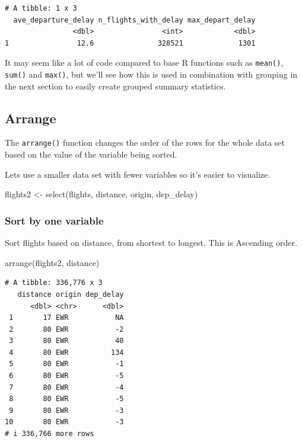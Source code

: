 \documentclass[
  letterpaper,
  DIV=11,
  numbers=noendperiod,
  oneside]{scrreprt}
\newenvironment{Shaded}{\begin{snugshade}}{\end{snugshade}}
\newcommand{\FunctionTok}[1]{\textcolor[rgb]{0.28,0.35,0.67}{#1}}
\newcommand{\NormalTok}[1]{\textcolor[rgb]{0.00,0.23,0.31}{#1}}
\newcommand{\OtherTok}[1]{\textcolor[rgb]{0.00,0.23,0.31}{#1}}
\begin{document}
\begin{verbatim}
# A tibble: 1 x 3
  ave_departure_delay n_flights_with_delay max_depart_delay
                <dbl>                <int>            <dbl>
1                12.6               328521             1301
\end{verbatim}

It may seem like a lot of code compared to base R functions such as
\texttt{mean()}, \texttt{sum()} and \texttt{max()}, but we'll see how
this is used in combination with grouping in the next section to easily
create grouped summary statistics.

\subsection{Arrange}\label{arrange}

The \texttt{arrange()} function changes the order of the rows for the
whole data set based on the value of the variable being sorted.

Lets use a smaller data set with fewer variables so it's easier to
visualize.

\begin{Shaded}
\begin{Highlighting}[]
\NormalTok{flights2 }\OtherTok{\textless{}{-}} \FunctionTok{select}\NormalTok{(flights, distance, origin, dep\_delay)}
\end{Highlighting}
\end{Shaded}

\subsubsection{Sort by one variable}\label{sort-by-one-variable}

Sort flights based on distance, from shortest to longest. This is
Ascending order.

\begin{Shaded}
\begin{Highlighting}[]
\FunctionTok{arrange}\NormalTok{(flights2, distance)}
\end{Highlighting}
\end{Shaded}

\begin{verbatim}
# A tibble: 336,776 x 3
   distance origin dep_delay
      <dbl> <chr>      <dbl>
 1       17 EWR           NA
 2       80 EWR           -2
 3       80 EWR           40
 4       80 EWR          134
 5       80 EWR           -1
 6       80 EWR           -5
 7       80 EWR           -4
 8       80 EWR           -5
 9       80 EWR           -3
10       80 EWR           -3
# i 336,766 more rows
\end{verbatim}
\end{document}
